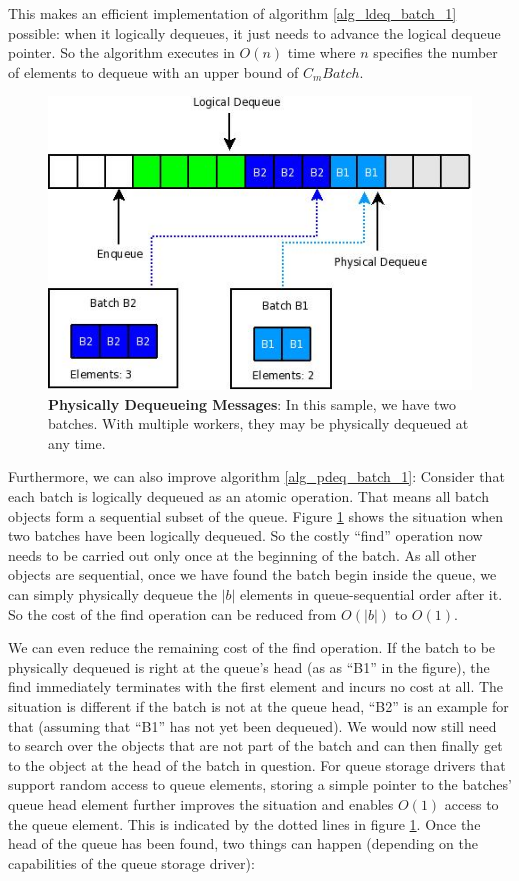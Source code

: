 \documentclass[a4paper,10pt]{article}
\begin{document}
This makes an efficient implementation of algorithm \ref{alg_ldeq_batch_1} possible: when it logically dequeues, it just needs to advance the logical dequeue pointer. So the algorithm executes in $O(n)$ time where $n$ specifies the number of elements to dequeue with an upper bound of $C_mBatch$.

\begin{figure}[h]
\begin{center}
\includegraphics[scale=0.6]{rsyslog_queue_pointers2.jpeg}
\end{center}
\caption{\textbf{Physically Dequeueing Messages}: In this sample, we have two batches. With multiple workers, they may be physically dequeued at any time.}
\label{fig_queue_ptr_deq}
\end{figure}

Furthermore, we can also improve algorithm \ref{alg_pdeq_batch_1}: Consider that each batch is logically dequeued as an atomic operation. That means all batch objects form a sequential subset of the queue. Figure \ref{fig_queue_ptr_deq} shows the situation when two batches have been logically dequeued.  So the costly ``find'' operation now needs to be carried out only once at the beginning of the batch. As all other objects are sequential, once we have found the batch begin inside the queue, we can simply physically dequeue the $|b|$ elements in queue-sequential order after it. So the cost of the find operation can be reduced from $O(|b|)$ to $O(1)$.

We can even reduce the remaining cost of the find operation. If the batch to be physically dequeued is right at the queue's head (as as ``B1'' in the figure), the find immediately terminates with the first element and incurs no cost at all. The situation is different if the batch is not at the queue head, ``B2'' is an example for that (assuming that ``B1'' has not yet been dequeued). We would now still need to search over the objects that are not part of the batch and can then finally get to the object at the head of the batch in question. For queue storage drivers that support random access to queue elements, storing a simple pointer to the batches' queue head element further improves the situation and enables $O(1)$ access to the queue element. This is indicated by the dotted lines in figure \ref{fig_queue_ptr_deq}. Once the head of the queue has been found, two things can happen (depending on the capabilities of the queue storage driver):
\end{document}
